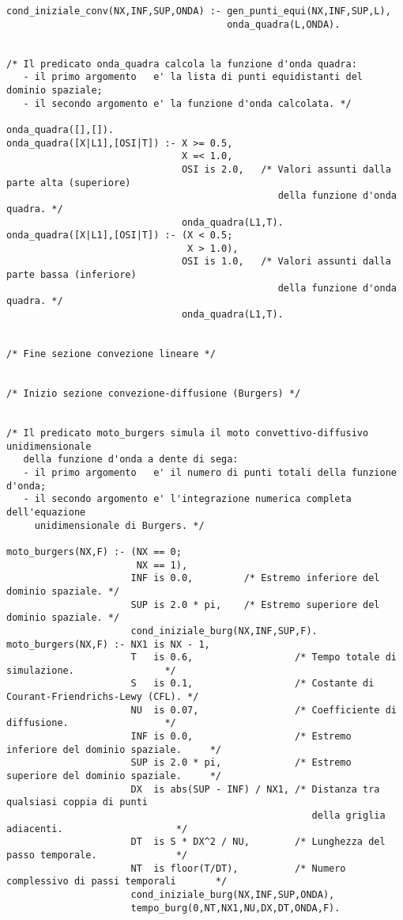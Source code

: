 \begin{verbatim}
cond_iniziale_conv(NX,INF,SUP,ONDA) :- gen_punti_equi(NX,INF,SUP,L),
                                       onda_quadra(L,ONDA).


/* Il predicato onda_quadra calcola la funzione d'onda quadra:
   - il primo argomento   e' la lista di punti equidistanti del dominio spaziale;
   - il secondo argomento e' la funzione d'onda calcolata. */

onda_quadra([],[]).
onda_quadra([X|L1],[OSI|T]) :- X >= 0.5,
                               X =< 1.0,
                               OSI is 2.0,   /* Valori assunti dalla parte alta (superiore) 
                                                della funzione d'onda quadra. */
                               onda_quadra(L1,T).
onda_quadra([X|L1],[OSI|T]) :- (X < 0.5; 
                                X > 1.0),
                               OSI is 1.0,   /* Valori assunti dalla parte bassa (inferiore) 
                                                della funzione d'onda quadra. */
                               onda_quadra(L1,T).


/* Fine sezione convezione lineare */


/* Inizio sezione convezione-diffusione (Burgers) */


/* Il predicato moto_burgers simula il moto convettivo-diffusivo unidimensionale
   della funzione d'onda a dente di sega:
   - il primo argomento   e' il numero di punti totali della funzione d'onda;
   - il secondo argomento e' l'integrazione numerica completa dell'equazione 
     unidimensionale di Burgers. */

moto_burgers(NX,F) :- (NX == 0;
                       NX == 1),
                      INF is 0.0,         /* Estremo inferiore del dominio spaziale. */
                      SUP is 2.0 * pi,    /* Estremo superiore del dominio spaziale. */
                      cond_iniziale_burg(NX,INF,SUP,F).
moto_burgers(NX,F) :- NX1 is NX - 1,
                      T   is 0.6,                  /* Tempo totale di simulazione.                */
                      S   is 0.1,                  /* Costante di Courant-Friendrichs-Lewy (CFL). */
                      NU  is 0.07,                 /* Coefficiente di diffusione.                 */
                      INF is 0.0,                  /* Estremo inferiore del dominio spaziale.     */
                      SUP is 2.0 * pi,             /* Estremo superiore del dominio spaziale.     */
                      DX  is abs(SUP - INF) / NX1, /* Distanza tra qualsiasi coppia di punti
                                                      della griglia adiacenti.                    */
                      DT  is S * DX^2 / NU,        /* Lunghezza del passo temporale.              */
                      NT  is floor(T/DT),          /* Numero complessivo di passi temporali       */
                      cond_iniziale_burg(NX,INF,SUP,ONDA),
                      tempo_burg(0,NT,NX1,NU,DX,DT,ONDA,F).



\end{verbatim}
